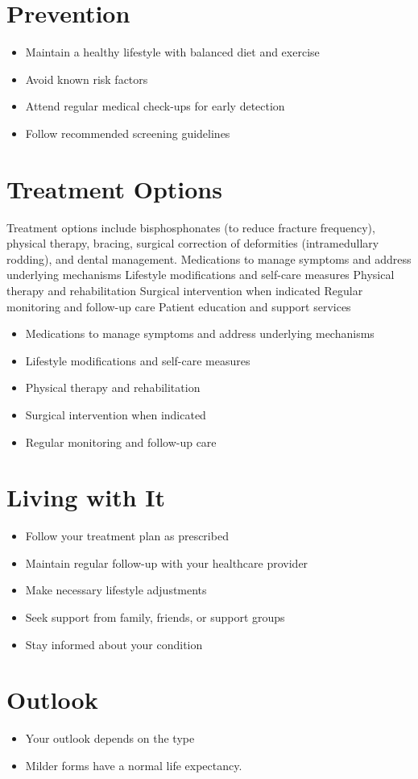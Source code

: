 \section{Prevention}
\begin{itemize}[noitemsep]
  \item Maintain a healthy lifestyle with balanced diet and exercise
  \item Avoid known risk factors
  \item Attend regular medical check-ups for early detection
  \item Follow recommended screening guidelines
\end{itemize}
\section{Treatment Options}
Treatment options include bisphosphonates (to reduce fracture frequency), physical therapy, bracing, surgical correction of deformities (intramedullary rodding), and dental management. Medications to manage symptoms and address underlying mechanisms Lifestyle modifications and self-care measures Physical therapy and rehabilitation Surgical intervention when indicated Regular monitoring and follow-up care Patient education and support services

\begin{itemize}[noitemsep]
  \item Medications to manage symptoms and address underlying mechanisms
  \item Lifestyle modifications and self-care measures
  \item Physical therapy and rehabilitation
  \item Surgical intervention when indicated
  \item Regular monitoring and follow-up care
\end{itemize}
\section{Living with It}
\begin{itemize}[noitemsep]
  \item Follow your treatment plan as prescribed
  \item Maintain regular follow-up with your healthcare provider
  \item Make necessary lifestyle adjustments
  \item Seek support from family, friends, or support groups
  \item Stay informed about your condition
\end{itemize}
\section{Outlook}
\begin{itemize}[noitemsep]
  \item Your outlook depends on the type
  \item Milder forms have a normal life expectancy.
\end{itemize}
